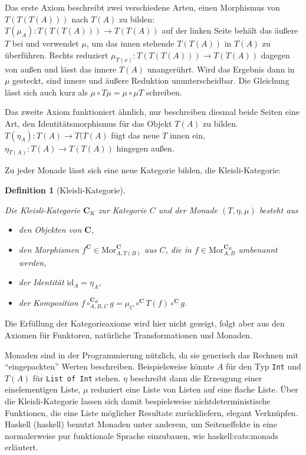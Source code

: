 \documentclass[11pt, a4paper, bibgerm]{book}
\newcommand\icode[1]{\lstinline?#1?}
\newcommand\sref{}
\newcommand\ato{\rightarrow} %
\newtheorem{defini}{Definition}
\newcommand{\defi}[2]{%
  \begin{defini}[#1]
    \label{def:#1}
    #2
  \end{defini}
}
\begin{document}
Das erste Axiom beschreibt zwei verschiedene Arten, einen Morphismus von
$T(T(T(A)))$ nach $T(A)$ zu bilden: $T(\mu_A):T(T(T(A))) \ato T(T(A))$
auf der linken Seite behält das äußere $T$ bei und verwendet $\mu$, um
das innen stehende $T(T(A))$ in $T(A)$ zu überführen. Rechts reduziert
$\mu_{T(x)}:T(T(T(A))) \ato T(T(A))$ dagegen von außen und lässt das
innere $T(A)$ unangerührt. Wird das Ergebnis dann in $\mu$ gesteckt,
sind innere und äußere Reduktion ununterscheidbar. Die Gleichung lässt
sich auch kurz als $\mu \circ T \mu = \mu \circ \mu T$ schreiben.

Das zweite Axiom funktioniert ähnlich, nur beschreiben diesmal beide
Seiten eine Art, den Identitätsmorphismus für das Objekt $T(A)$ zu
bilden. $T(\eta_A):T(A) \ato T(T(A)$ fügt das neue $T$ innen ein,
$\eta_{T(A)}:T(A) \ato T(T(A))$ hingegen außen.

Zu jeder Monade lässt sich eine neue Kategorie bilden, die Kleisli-Kategorie:
\defi{Kleisli-Kategorie}{
Die Kleisli-Kategorie $\mathbf{C}_K$ zur Kategorie $C$ und der
Monade $(T,\eta,\mu)$ besteht aus
\begin{itemize}
\item den Objekten von $\mathbf{C}$,
\item den Morphismen $f^{\mathbf{C}} \in
  \mathrm{Mor}^{\mathbf{C}}_{A,T(B)}$ aus $C$, die in $f \in
  \mathrm{Mor}^{\mathbf{C}_K}_{A,B}$ umbenannt werden,
\item der Identität $\mathrm{id}_A = \eta_A$,
\item der Komposition $f \circ^{\mathbf{C}_K}_{A,B,C} g = \mu_C
  \circ^{\mathbf{C}} T(f) \circ^{\mathbf{C}} g$.
\end{itemize}
}
Die Erfüllung der Kategorieaxiome wird hier nicht gezeigt, folgt aber
aus den Axiomen für Funktoren, natürliche Transformationen und Monaden.

Monaden sind in der Programmierung nützlich, da sie generisch das
Rechnen mit "`eingepackten"' Werten beschreiben. Beispielsweise könnte
$A$ für den Typ \icode{Int} und $T(A)$ für \icode{List of Int}
stehen. $\eta$ beschreibt dann die Erzeugung einer einelementigen Liste,
$\mu$ reduziert eine Liste von Listen auf eine flache Liste. Über die
Kleisli-Kategorie lassen sich damit bespielsweise nichtdeterministische
Funktionen, die eine Liste möglicher Resultate zurückliefern, elegant
Verknüpfen. Haskell (\sref{haskell}) benutzt Monaden unter
anderem, um Seiteneffekte in eine normalerweise pur funktionale Sprache
einzubauen, wie \sref{haskell:cats:monads} erläutert.
\end{document}
